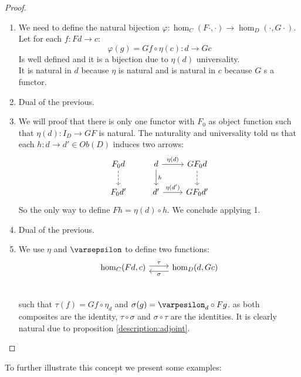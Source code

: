 \begin{proof}
  \begin{enumerate}
    
  \item We need to define the natural bijection $\varphi: \hom_C(F\cdot,\cdot)\to \hom_D(\cdot,G\cdot)$. Let  for each $f:Fd \to c$:
    $$\varphi(g) = Gf\circ \eta(c): d \to Gc$$ Is well defined and it is a bijection  due to $\eta(d)$ universality.\\

    It is natural in $d$ because $\eta$ is natural and is natural in $c$ because $G$ s a functor.
  \item Dual of the previous.
  \item We will proof that there is only one functor with $F_0$ as object function such that $\eta (d): I_D\to GF$ is natural. The naturality and universality told us that each $h:d\to d'\in Ob(D)$ induces two arrows:
    \[
      \begin{tikzcd}
        F_0 d\arrow[dashed]{d} & d\arrow{d}{h}\arrow{r}{\eta (d)}&GF_0d\arrow[dashed]{d}\\
        F_0 d'& d'\arrow{r}{\eta (d')} & GF_0d'
      \end{tikzcd}
    \]
    So the only way to define $Fh= \eta (d) \circ h$. We conclude applying 1.
  \item Dual of the previous.
  \item We use $\eta$ and $\varsepsilon$ to define two functions:
    \[
      \begin{tikzcd}
        \hom_C(Fd,c) \arrow[r, shift left=.5ex, "\tau"{name=F}] &
        \hom_D(d,Gc)\arrow[l, shift left=1ex, "\sigma"{name=G}] \\
      \end{tikzcd}
    \]

    such that $\tau(f) = Gf\circ \eta_d$ and $\sigma(g)=\varpesilon_d \circ Fg$. as both composites are the identity, $\tau \circ \sigma$ and $\sigma \circ \tau$ are the identities. It is clearly natural due to proposition \ref{description:adjoint}.
  \end{enumerate}
\end{proof}
To further illustrate this concept we present some examples:

